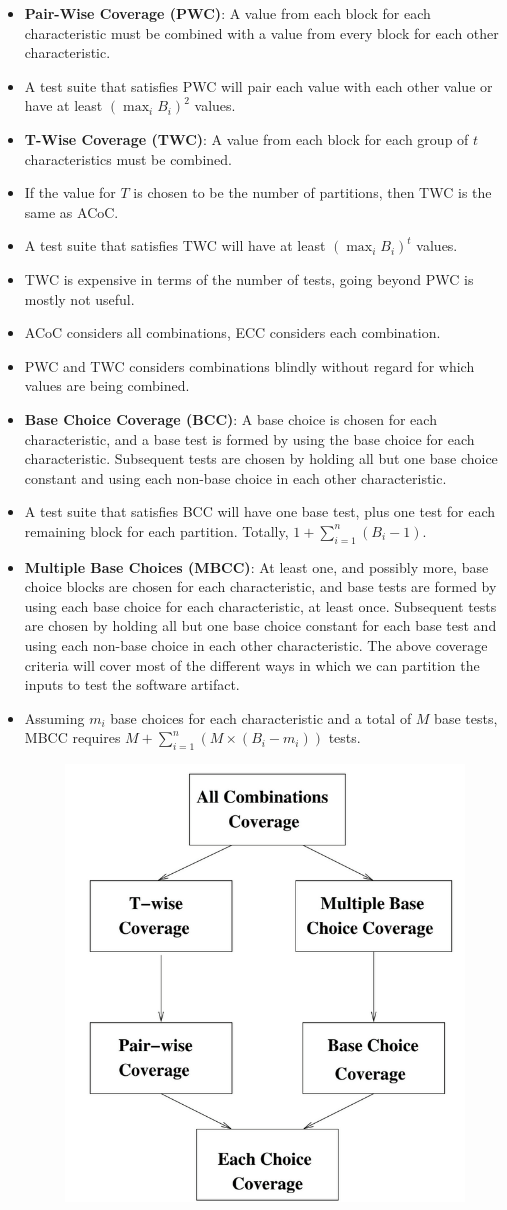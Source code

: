 \documentclass[a4paper]{article}
\begin{document}
\begin{itemize}
    \item \textbf{Pair-Wise Coverage (PWC)}: A value from each block for each characteristic must be combined with a value from every block for each other characteristic.
    \item A test suite that satisfies PWC will pair each value with each other value or have at least $(\max_iB_i)^2$ values.
    \item \textbf{T-Wise Coverage (TWC)}: A value from each block for each group of $t$ characteristics must be combined.
    \item If the value for $T$ is chosen to be the number of partitions, then TWC is the same as ACoC.
    \item A test suite that satisfies TWC will have at least $(\max_iB_i)^t$ values.
    \item TWC is expensive in terms of the number of tests, going beyond PWC is mostly not useful.
    \item ACoC considers all combinations, ECC considers each combination.
    \item PWC and TWC considers combinations blindly without regard for which values are being combined.
    \item \textbf{Base Choice Coverage (BCC)}: A base choice is chosen for each characteristic, and a base test is formed by using the base choice for each characteristic. Subsequent tests are chosen by holding all but one base choice constant and using each non-base choice in each other characteristic.
    \item A test suite that satisfies BCC will have one base test, plus one test for each remaining block for each partition. Totally, $1+\sum_{i=1}^n(B_i-1)$.
    \item \textbf{Multiple Base Choices (MBCC)}: At least one, and possibly more, base choice blocks are chosen for each characteristic, and base tests are formed by using each base choice for each characteristic, at least once. Subsequent tests are chosen by holding all but one base choice constant for each base test and using each non-base choice in each other characteristic. The above coverage criteria will cover most of the different ways in which we can partition the inputs to test the software artifact.
    \item Assuming $m_i$ base choices for each characteristic and a total of $M$ base tests, MBCC requires $M+\sum_{i=1}^n(M\times (B_i-m_i))$ tests.
    \begin{figure}[H]
        \centering
        \includegraphics[width=0.35\linewidth]{Degree//static/ST_ISP_subsumption.png}

\end{figure}
\end{itemize}
\end{document}
